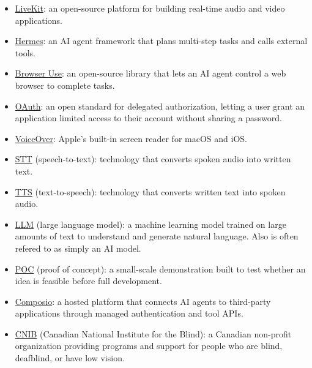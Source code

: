 \documentclass{scrreprt}
\theoremstyle{definition}
\begin{document}
\begin{itemize}
    \item \href{https://docs.livekit.io/intro/overview/}{LiveKit}: an open-source platform for building real-time audio and video applications. \citep{LiveKitOverview}
    \item \href{https://hermes-agent.nousresearch.com/docs/developer-guide/programmatic-integration}{Hermes}: an AI agent framework that plans multi-step tasks and calls external tools. \citep{HermesIntegration}
    \item \href{https://github.com/browser-use/browser-use}{Browser Use}: an open-source library that lets an AI agent control a web browser to complete tasks. \citep{BrowserUseSource}
    \item \href{https://oauth.net/2/}{OAuth}: an open standard for delegated authorization, letting a user grant an application limited access to their account without sharing a password. \citep{OAuth2}
    \item \href{https://support.apple.com/guide/voiceover/welcome/mac}{VoiceOver}: Apple's built-in screen reader for macOS and iOS. \citep{VoiceOverGuide}
    \item \href{https://www.ibm.com/think/topics/speech-to-text}{STT} (speech-to-text): technology that converts spoken audio into written text. \citep{IBMSTT}
    \item \href{https://www.ibm.com/think/topics/text-to-speech}{TTS} (text-to-speech): technology that converts written text into spoken audio. \citep{IBMTTS}
    \item \href{https://www.ibm.com/think/topics/large-language-models}{LLM} (large language model): a machine learning model trained on large amounts of text to understand and generate natural language. Also is often refered to as simply an AI model.\citep{IBMLLM}
    \item \href{https://en.wikipedia.org/wiki/Proof_of_concept}{POC} (proof of concept): a small-scale demonstration built to test whether an idea is feasible before full development. \citep{POCWiki}
    \item \href{https://composio.dev/}{Composio}: a hosted platform that connects AI agents to third-party applications through managed authentication and tool APIs. \citep{ComposioSite}
    \item \href{https://www.cnib.ca/en/about-us}{CNIB} (Canadian National Institute for the Blind): a Canadian non-profit organization providing programs and support for people who are blind, deafblind, or have low vision. \citep{CNIBAbout}

\end{itemize}
\end{document}
